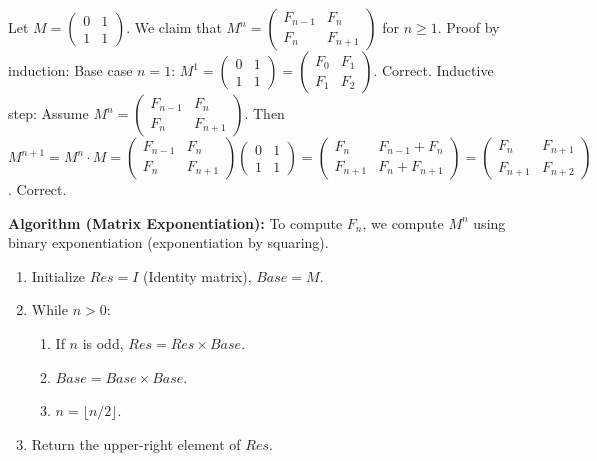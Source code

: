\begin{solution}
Let $M = \begin{pmatrix} 0 & 1 \\ 1 & 1 \end{pmatrix}$. We claim that $M^n = \begin{pmatrix} F_{n-1} & F_n \\ F_n & F_{n+1} \end{pmatrix}$ for $n \ge 1$.
Proof by induction:
Base case $n=1$: $M^1 = \begin{pmatrix} 0 & 1 \\ 1 & 1 \end{pmatrix} = \begin{pmatrix} F_0 & F_1 \\ F_1 & F_2 \end{pmatrix}$. Correct.
Inductive step: Assume $M^n = \begin{pmatrix} F_{n-1} & F_n \\ F_n & F_{n+1} \end{pmatrix}$.
Then $M^{n+1} = M^n \cdot M = \begin{pmatrix} F_{n-1} & F_n \\ F_n & F_{n+1} \end{pmatrix} \begin{pmatrix} 0 & 1 \\ 1 & 1 \end{pmatrix} = \begin{pmatrix} F_n & F_{n-1} + F_n \\ F_{n+1} & F_n + F_{n+1} \end{pmatrix} = \begin{pmatrix} F_n & F_{n+1} \\ F_{n+1} & F_{n+2} \end{pmatrix}$. Correct.

\textbf{Algorithm (Matrix Exponentiation):}
To compute $F_n$, we compute $M^n$ using binary exponentiation (exponentiation by squaring).
\begin{enumerate}
    \item Initialize $Res = I$ (Identity matrix), $Base = M$.
    \item While $n > 0$:
    \begin{enumerate}
        \item If $n$ is odd, $Res = Res \times Base$.
        \item $Base = Base \times Base$.
        \item $n = \lfloor n/2 \rfloor$.
    \end{enumerate}
    \item Return the upper-right element of $Res$.
\end{enumerate}


\end{solution}
